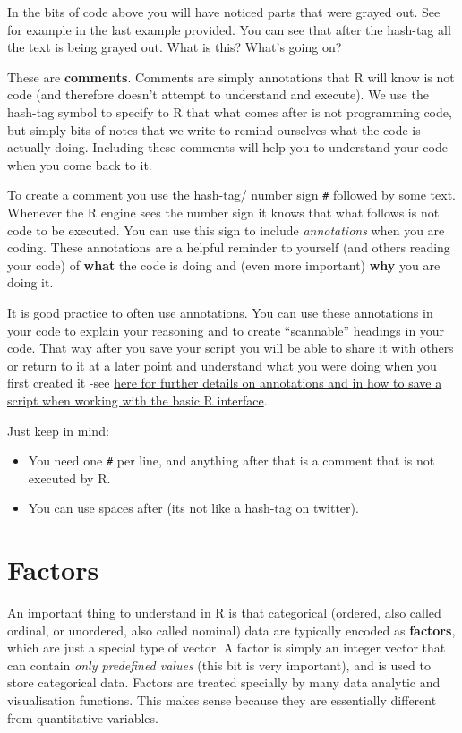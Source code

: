\documentclass[]{book}
\providecommand{\tightlist}{%
  \setlength{\itemsep}{0pt}\setlength{\parskip}{0pt}}
\begin{document}
In the bits of code above you will have noticed parts that were grayed out. See for example in the last example provided. You can see that after the hash-tag all the text is being grayed out. What is this? What's going on?

These are \textbf{comments}. Comments are simply annotations that R will know is not code (and therefore doesn't attempt to understand and execute). We use the hash-tag symbol to specify to R that what comes after is not programming code, but simply bits of notes that we write to remind ourselves what the code is actually doing. Including these comments will help you to understand your code when you come back to it.

To create a comment you use the hash-tag/ number sign \texttt{\#} followed by some text. Whenever the R engine sees the number sign it knows that what follows is not code to be executed. You can use this sign to include \emph{annotations} when you are coding. These annotations are a helpful reminder to yourself (and others reading your code) of \textbf{what} the code is doing and (even more important) \textbf{why} you are doing it.

It is good practice to often use annotations. You can use these annotations in your code to explain your reasoning and to create ``scannable'' headings in your code. That way after you save your script you will be able to share it with others or return to it at a later point and understand what you were doing when you first created it -see \href{http://www.screenr.com/1VN8}{here for further details on annotations and in how to save a script when working with the basic R interface}.

Just keep in mind:

\begin{itemize}
\tightlist
\item
  You need one \texttt{\#} per line, and anything after that is a comment that is not executed by R.
\item
  You can use spaces after (its not like a hash-tag on twitter).
\end{itemize}

\hypertarget{factors}{%
\section{Factors}\label{factors}}

An important thing to understand in R is that categorical (ordered, also called ordinal, or unordered, also called nominal) data are typically encoded as \textbf{factors}, which are just a special type of vector. A factor is simply an integer vector that can contain \emph{only predefined values} (this bit is very important), and is used to store categorical data. Factors are treated specially by many data analytic and visualisation functions. This makes sense because they are essentially different from quantitative variables.
\end{document}
